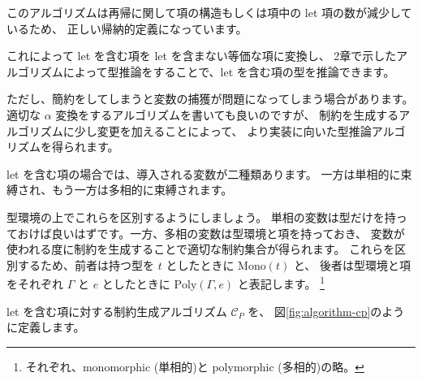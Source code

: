 このアルゴリズムは再帰に関して項の構造もしくは項中の let 項の数が減少しているため、
正しい帰納的定義になっています。

これによって let を含む項を let を含まない等価な項に変換し、
2章で示したアルゴリズムによって型推論をすることで、let を含む項の型を推論できます。

ただし、簡約をしてしまうと変数の捕獲が問題になってしまう場合があります。
適切な $\alpha$ 変換をするアルゴリズムを書いても良いのですが、
制約を生成するアルゴリズムに少し変更を加えることによって、
より実装に向いた型推論アルゴリズムを得られます。

let を含む項の場合では、導入される変数が二種類あります。
一方は単相的に束縛され、もう一方は多相的に束縛されます。

型環境の上でこれらを区別するようにしましょう。
単相の変数は型だけを持っておけば良いはずです。一方、多相の変数は型環境と項を持っておき、
変数が使われる度に制約を生成することで適切な制約集合が得られます。
これらを区別するため、前者は持つ型を $t$ としたときに $\mathrm{Mono}(t)$ と、
後者は型環境と項をそれぞれ $\Gamma$ と $e$ としたときに $\mathrm{Poly}(\Gamma, e)$ と表記します。
\footnote{それぞれ、monomorphic (単相的)と polymorphic (多相的)の略。}

let を含む項に対する制約生成アルゴリズム $\mathcal{C}_P$ を、
図\ref{fig:algorithm-cp}のように定義します。


